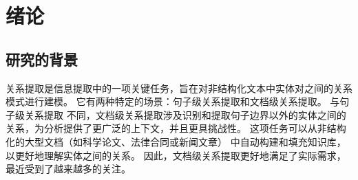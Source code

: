 \documentclass[bachelor]{thesis-uestc}
\begin{document}
\thesistableofcontents

\chapter{绪\hspace{6pt}论}

\section{研究的背景}

关系提取是信息提取中的一项关键任务，旨在对非结构化文本中实体对之间的关系模式进行建模。
它有两种特定的场景：句子级关系提取和文档级关系提取。
与句子级关系提取 \cite{sentenceRE-Dixit, sentenceRE-Lyu} 不同，文档级关系提取涉及识别和提取句子边界以外的实体之间的关系，为分析提供了更广泛的上下文，并且更具挑战性。
这项任务可以从非结构化的大型文档（如科学论文、法律合同或新闻文章） \cite{delaunay2023comprehensive} 中自动构建和填充知识库，以更好地理解实体之间的关系。
因此，文档级关系提取更好地满足了实际需求，最近受到了越来越多的关注。\par

\end{document}
